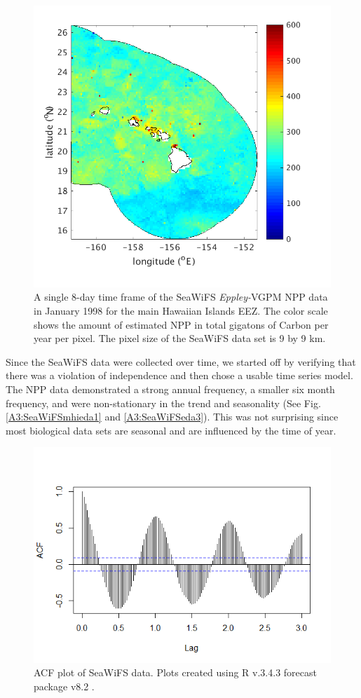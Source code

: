 \documentclass[oneside,12pt,final]{sty/ucthesis-CA2012}
\let\cite\citep                             %
\begin{document}
\begin{mainmatter}
\begin{figure}[H]
     \centering
       \includegraphics[width=.7\textwidth]{fig/SeaWiFSmhi}
    \caption{A single 8-day time frame of the SeaWiFS \textit{Eppley-}VGPM NPP data in January 1998 for the main Hawaiian Islands EEZ. The color scale shows the amount of estimated NPP in total gigatons of Carbon per year per pixel. The pixel size of the SeaWiFS data set is 9 by 9 km.}
    \label{A3:SeaWiFSmhi}
\end{figure}

Since the SeaWiFS data were collected over time, we started off by verifying that there was a violation of independence and then chose a usable time series model. The NPP data demonstrated a strong annual frequency, a smaller six month frequency, and were non-stationary in the trend and seasonality (See Fig. \ref{A3:SeaWiFSmhieda1}  and \ref{A3:SeaWiFSeda3}). This was not surprising since most biological data sets are seasonal and are influenced by the time of year. 

\begin{figure}[H]
     \centering
       \includegraphics[width=.7\textwidth]{fig/seawifs_acf}
    \caption{ACF plot of SeaWiFS data. Plots created using R v.3.4.3 \cite{Rcite} forecast package v8.2 \cite{forecast1, forecast2}.}
    \label{A3:SeaWiFSeda1}
\end{figure}


\end{mainmatter}
\end{document}
